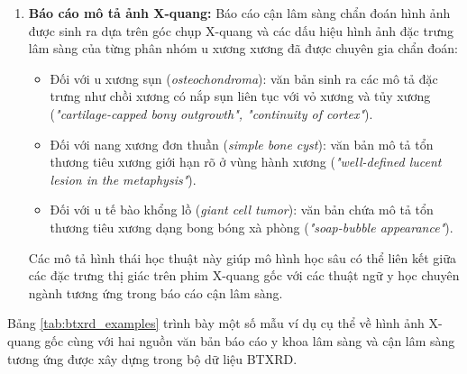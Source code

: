 \begin{enumerate}
    \item \textbf{Báo cáo mô tả ảnh X-quang:}
    Báo cáo cận lâm sàng chẩn đoán hình ảnh được sinh ra dựa trên góc chụp X-quang và các dấu hiệu hình ảnh đặc trưng lâm sàng của từng phân nhóm u xương xương đã được chuyên gia chẩn đoán:
    \begin{itemize}
        \item Đối với u xương sụn (\textit{osteochondroma}): văn bản sinh ra các mô tả đặc trưng như chồi xương có nắp sụn liên tục với vỏ xương và tủy xương (\textit{"cartilage-capped bony outgrowth", "continuity of cortex"}).
        \item Đối với nang xương đơn thuần (\textit{simple bone cyst}): văn bản mô tả tổn thương tiêu xương giới hạn rõ ở vùng hành xương (\textit{"well-defined lucent lesion in the metaphysis"}).
        \item Đối với u tế bào khổng lồ (\textit{giant cell tumor}): văn bản chứa mô tả tổn thương tiêu xương dạng bong bóng xà phòng (\textit{"soap-bubble appearance"}).
    \end{itemize}
    Các mô tả hình thái học thuật này giúp mô hình học sâu có thể liên kết giữa các đặc trưng thị giác trên phim X-quang gốc với các thuật ngữ y học chuyên ngành tương ứng trong báo cáo cận lâm sàng.
\end{enumerate}

Bảng \ref{tab:btxrd_examples} trình bày một số mẫu ví dụ cụ thể về hình ảnh X-quang gốc cùng với hai nguồn văn bản báo cáo y khoa lâm sàng và cận lâm sàng tương ứng được xây dựng trong bộ dữ liệu BTXRD.


